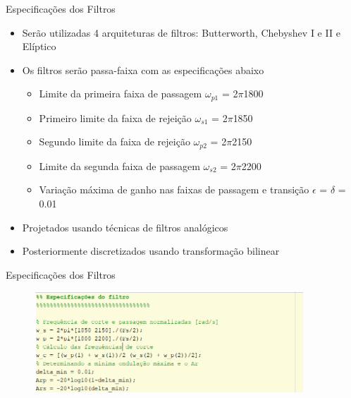 \begin{frame}{Especificações dos Filtros}
    \begin{itemize}
    \item Serão utilizadas 4 arquiteturas de filtros: Butterworth, Chebyshev I e II e Elíptico
        \item Os filtros serão passa-faixa com as especificações abaixo
            \begin{itemize}
                \item Limite da primeira faixa de passagem $\omega_{p1}$ = 2$\pi$1800
                \item Primeiro limite da faixa de rejeição $\omega_{s1}$ = 2$\pi$1850
                \item Segundo limite da faixa de rejeição $\omega_{p2}$ = 2$\pi$2150
                \item Limite da segunda faixa de passagem $\omega_{s2}$ = 2$\pi$2200
                \item Variação máxima de ganho nas faixas de passagem e transição $\epsilon$ = $\delta$ = 0.01 
            \end{itemize}
        
        \item Projetados usando técnicas de filtros analógicos
        
        \item Posteriormente discretizados usando transformação bilinear  
        
    \end{itemize}
\end{frame}

\begin{frame}{Especificações dos Filtros}
    \begin{figure}[!htb]
        \includegraphics[width=0.9\textwidth]{graficos/especificacoes.png}
        \end{figure} 
\end{frame}

